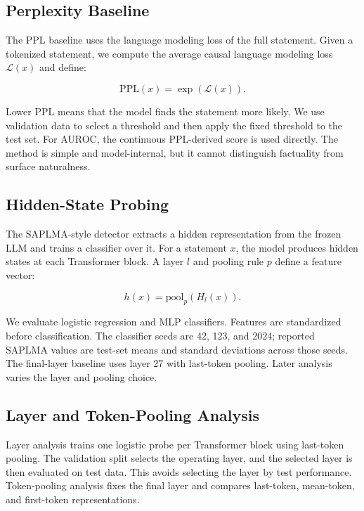\documentclass[11pt]{article}
\begin{document}
\subsection{Perplexity Baseline}

The PPL baseline uses the language modeling loss of the full statement. Given a tokenized statement, we compute the average causal language modeling loss \(\mathcal{L}(x)\) and define:

\begin{equation}
\mathrm{PPL}(x) = \exp(\mathcal{L}(x)).
\end{equation}

Lower PPL means that the model finds the statement more likely. We use validation data to select a threshold and then apply the fixed threshold to the test set. For AUROC, the continuous PPL-derived score is used directly. The method is simple and model-internal, but it cannot distinguish factuality from surface naturalness.

\subsection{Hidden-State Probing}

The SAPLMA-style detector extracts a hidden representation from the frozen LLM and trains a classifier over it. For a statement \(x\), the model produces hidden states at each Transformer block. A layer \(l\) and pooling rule \(p\) define a feature vector:

\begin{equation}
h(x) = \mathrm{pool}_p(H_l(x)).
\end{equation}

We evaluate logistic regression and MLP classifiers. Features are standardized before classification. The classifier seeds are 42, 123, and 2024; reported SAPLMA values are test-set means and standard deviations across those seeds. The final-layer baseline uses layer 27 with last-token pooling. Later analysis varies the layer and pooling choice.

\subsection{Layer and Token-Pooling Analysis}

Layer analysis trains one logistic probe per Transformer block using last-token pooling. The validation split selects the operating layer, and the selected layer is then evaluated on test data. This avoids selecting the layer by test performance. Token-pooling analysis fixes the final layer and compares last-token, mean-token, and first-token representations.
\end{document}
